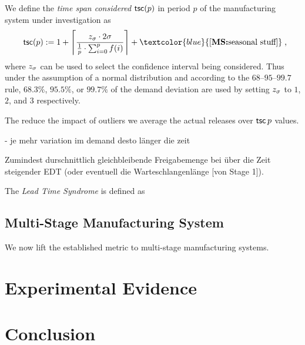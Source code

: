 \documentclass[mnsc]{informs3}
\DeclarePairedDelimiter{\ceil}{\lceil}{\rceil}
\newcommand\MS[2][r]{\ifx t#1 \textcolor{blue}{[\textbf{MS:} #2]}
  \else \begin{center}\textcolor{blue}{\textbf{MS:} #2} \end{center} \fi}
\begin{document}
\begin{definition}
  We define the \emph{time span considered} $\operatorname*{\mathsf{tsc}}(p)$ in period $p$ of the manufacturing system
  under investigation as
  \begin{align*}
    \tsc(p) \defsym 1 + \ceil[\Bigg]{\frac{ \zs \cdot 2 \sigma}{\frac{1}{p} \cdot \sum_{i=0}^{p}{f(i)}}} +
    \MS[t]{\text{seasonal stuff}} \tcom
  \end{align*}
  where $z_{\sigma}$ can be used to select the confidence interval being considered. Thus under the
  assumption of a normal distribution and according to the $68$--$95$--$99.7$ rule, $68.3\%$,
  $95.5\%$, or $99.7\%$ of the demand deviation are used by setting $z_{\sigma}$ to $1$, $2$,
  and $3$ respectively.

\end{definition}


The reduce the impact of outliers we average the actual releases over $\operatorname*{\mathsf{tsc}}{p}$ values.


- je mehr variation im demand desto länger die zeit


Zumindest durschnittlich gleichbleibende Freigabemenge bei über die Zeit steigender EDT (oder
eventuell die Warteschlangenlänge [von Stage 1]).


\begin{definition}
  The \emph{Lead Time Syndrome} is defined as
\end{definition}



\subsection{Multi-Stage Manufacturing System}
\label{subsec:Multi-Stage_Manufacturing_System}


We now lift the established metric to multi-stage manufacturing systems.


\section{Experimental Evidence}
\label{sec:Experimental_Evidence}


\section{Conclusion}
\label{sec:Conclusion}




\end{document}
